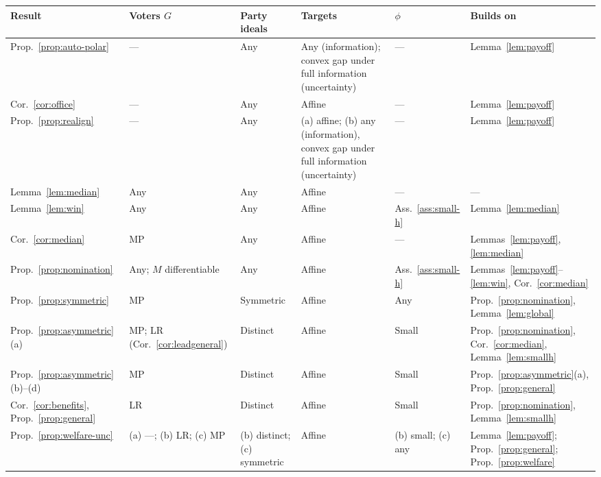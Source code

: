 \documentclass[12pt,letterpaper]{article}
\renewcommand{\arraystretch}{0.75}
\begin{document}
\begin{table}[p]
\begin{spacing}{1}
\centering
\footnotesize
\renewcommand{\arraystretch}{1.1}
\begin{adjustbox}{max totalsize={\textwidth}{0.83\textheight},center}
\begin{tabular}{@{}L{3.6cm}L{2.6cm}L{2.2cm}L{2.5cm}L{1.9cm}L{3.2cm}@{}}
\toprule
{\bfseries\boldmath Result} & {\bfseries\boldmath Voters $G$} & {\bfseries\boldmath Party ideals} & {\bfseries\boldmath Targets} & {\bfseries\boldmath $\phi$} & {\bfseries\boldmath Builds on} \\
\hline\hline
Prop.~\ref{prop:auto-polar} & --- & Any & Any (information); convex gap under full information (uncertainty) & --- & Lemma~\ref{lem:payoff} \\ \midrule
Cor.~\ref{cor:office} & --- & Any & Affine & --- & Lemma~\ref{lem:payoff} \\ \midrule
Prop.~\ref{prop:realign} & --- & Any & (a) affine; (b) any (information), convex gap under full information (uncertainty) & --- & Lemma~\ref{lem:payoff} \\ \midrule
Lemma~\ref{lem:median} & Any & Any & Affine & --- & --- \\ \midrule
Lemma~\ref{lem:win} & Any & Any & Affine & Ass.~\ref{ass:small-h} & Lemma~\ref{lem:median} \\ \midrule
Cor.~\ref{cor:median} & MP & Any & Affine & --- & Lemmas~\ref{lem:payoff}, \ref{lem:median} \\ \midrule
Prop.~\ref{prop:nomination} & Any; $M$ differentiable & Any & Affine & Ass.~\ref{ass:small-h} & Lemmas~\ref{lem:payoff}--\ref{lem:win}, Cor.~\ref{cor:median} \\ \midrule
Prop.~\ref{prop:symmetric} & MP & Symmetric & Affine & Any & Prop.~\ref{prop:nomination}, Lemma~\ref{lem:global} \\ \midrule
Prop.~\ref{prop:asymmetric}(a) & MP; LR (Cor.~\ref{cor:leadgeneral}) & Distinct & Affine & Small & Prop.~\ref{prop:nomination}, Cor.~\ref{cor:median}, Lemma~\ref{lem:smallh} \\ \midrule
Prop.~\ref{prop:asymmetric}(b)--(d) & MP & Distinct & Affine & Small & Prop.~\ref{prop:asymmetric}(a), Prop.~\ref{prop:general} \\ \midrule
Cor.~\ref{cor:benefits}, Prop.~\ref{prop:general} & LR & Distinct & Affine & Small & Prop.~\ref{prop:nomination}, Lemma~\ref{lem:smallh} \\ \midrule
Prop.~\ref{prop:welfare-unc} & (a) ---; (b) LR; (c) MP & (b) distinct; (c) symmetric & Affine & (b) small; (c) any & Lemma~\ref{lem:payoff}; Prop.~\ref{prop:general}; Prop.~\ref{prop:welfare} \\ \midrule

\end{tabular}
\end{adjustbox}
\end{spacing}
\end{table}
\end{document}
